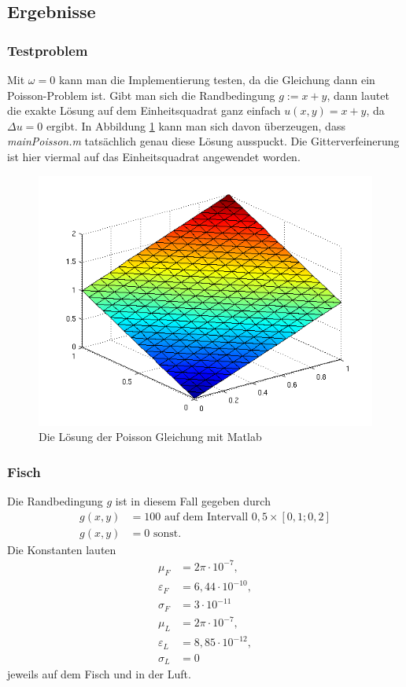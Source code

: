 \documentclass[ngerman,11pt,a4paper,titlepage]{article}
\begin{document}
\subsection{Ergebnisse}
\subsubsection*{Testproblem}
Mit $\omega=0$ kann man die Implementierung testen, da die Gleichung dann ein Poisson-Problem ist. Gibt man sich die Randbedingung $g:=x+y$, dann lautet die exakte Lösung auf dem Einheitsquadrat ganz einfach $u(x,y)=x+y$, da $\Delta u = 0$ ergibt. In Abbildung \ref{poiss} kann man sich davon überzeugen, dass \emph{mainPoisson.m} tatsächlich genau diese Lösung ausspuckt. Die Gitterverfeinerung ist hier viermal auf das Einheitsquadrat angewendet worden.
\begin{figure}[h]
  \begin{center}
    \includegraphics[scale=0.75]{pics/poisson.png}
  \end{center}
  \caption{Die Lösung der Poisson Gleichung mit Matlab}
  \label{poiss}
\end{figure}

\subsubsection*{Fisch}
Die Randbedingung $g$ ist in diesem Fall gegeben durch
\begin{align*}
  g(x,y) &=100 \text{ auf dem Intervall } 0,5 \times [0,1;0,2]\\
  g(x,y) &=0 \text{ sonst}.
\end{align*}
Die Konstanten lauten
\begin{align*}
  \mu_F &= 2\pi\cdot 10^{-7},\\
  \varepsilon_F &= 6,44\cdot 10^{-10},\\
  \sigma_F &= 3\cdot 10^{-11}\\
  \mu_L &= 2\pi\cdot 10^{-7},\\
  \varepsilon_L &= 8,85\cdot 10^{-12},\\
  \sigma_L &= 0
\end{align*}
jeweils auf dem Fisch und in der Luft.
\end{document}
